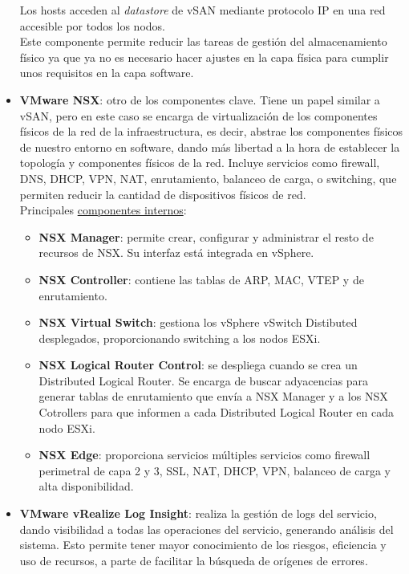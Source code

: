 \begin{itemize}
        \FloatBarrier
    Los hosts acceden al \textit{datastore} de vSAN mediante protocolo IP en una red accesible por todos los nodos. \\ 
    Este componente permite reducir las tareas de gestión del almacenamiento físico ya que ya no es necesario hacer ajustes en la capa física para cumplir unos requisitos en la capa software.
    \item \textbf{VMware NSX}: otro de los componentes clave. Tiene un papel similar a vSAN, pero en este caso se encarga de virtualización de los componentes físicos de la red de la infraestructura, es decir, abstrae los componentes físicos de nuestro entorno en software, dando más libertad a la hora de establecer la topología y componentes físicos de la red. Incluye servicios como firewall, DNS, DHCP, VPN, NAT, enrutamiento, balanceo de carga, o switching, que permiten reducir la cantidad de dispositivos físicos de red.\\
    Principales \underline{componentes internos}\cite{componentesNSX}:
    \begin{itemize}
        \item \textbf{NSX Manager}: permite crear, configurar y administrar el resto de recursos de NSX. Su interfaz está integrada en vSphere.
        \item \textbf{NSX Controller}: contiene las tablas de ARP, MAC, VTEP y de enrutamiento.
        \item \textbf{NSX Virtual Switch}: gestiona los vSphere vSwitch Distibuted desplegados, proporcionando switching a los nodos ESXi.
        \item \textbf{NSX Logical Router Control}: se despliega cuando se crea un Distributed Logical Router. Se encarga de buscar adyacencias para generar tablas de enrutamiento que envía a NSX Manager y a los NSX Cotrollers para que informen a cada Distributed Logical Router en cada nodo ESXi.
        \item \textbf{NSX Edge}: proporciona servicios múltiples servicios como firewall perimetral de capa 2 y 3, SSL, NAT, DHCP, VPN, balanceo de carga y alta disponibilidad.
    \end{itemize}
    \item \textbf{VMware vRealize Log Insight}: realiza la gestión de logs del servicio, dando visibilidad a todas las operaciones del servicio, generando análisis del sistema. Esto permite tener mayor conocimiento de los riesgos, eficiencia y uso de recursos, a parte de facilitar la búsqueda de orígenes de errores.\\

\end{itemize}

